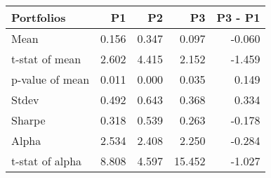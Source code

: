\begin{tabular}{lrrrr}
\toprule
Portfolios & P1 & P2 & P3 & P3 - P1 \\
\midrule
Mean & 0.156 & 0.347 & 0.097 & -0.060 \\
t-stat of mean & 2.602 & 4.415 & 2.152 & -1.459 \\
p-value of mean & 0.011 & 0.000 & 0.035 & 0.149 \\
Stdev & 0.492 & 0.643 & 0.368 & 0.334 \\
Sharpe & 0.318 & 0.539 & 0.263 & -0.178 \\
Alpha & 2.534 & 2.408 & 2.250 & -0.284 \\
t-stat of alpha & 8.808 & 4.597 & 15.452 & -1.027 \\
\bottomrule
\end{tabular}
